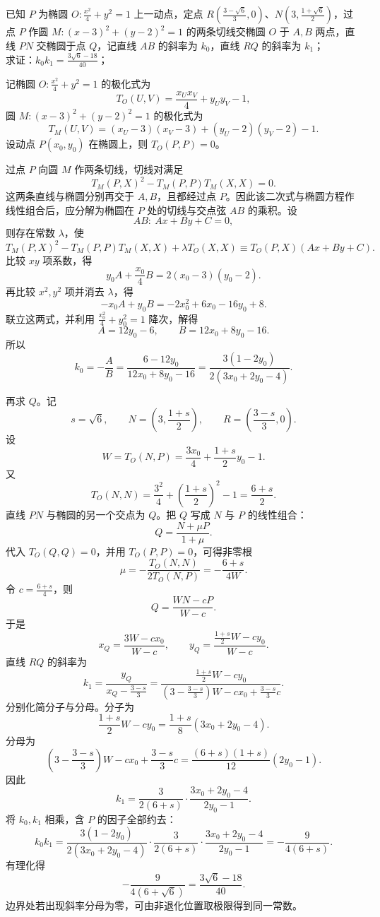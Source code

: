 \begin{exercise}
已知 \(P\) 为椭圆 \(O: \frac{x^2}{4} + y^2 = 1\) 上一动点，定点 \(R\left(\frac{3 - \sqrt{6}}{3}, 0\right)\)、\(N\left(3, \frac{1 + \sqrt{6}}{2}\right)\)，过点 \(P\) 作圆 \(M: (x - 3)^2 + (y - 2)^2 = 1\) 的两条切线交椭圆 \(O\) 于 \(A,B\) 两点，直线 \(PN\) 交椭圆于点 \(Q\)，记直线 \(AB\) 的斜率为 \(k_0\)，直线 \(RQ\) 的斜率为 \(k_1\)；\\
求证：\(k_0 k_1 = \frac{3\sqrt{6} - 18}{40}\)；
\end{exercise}
\begin{solution}
记椭圆 $O: \frac{x^2}{4}+y^2=1$ 的极化式为
\[
T_O(U,V)=\frac{x_Ux_V}{4}+y_Uy_V-1,
\]
圆 $M:(x-3)^2+(y-2)^2=1$ 的极化式为
\[
T_M(U,V)=(x_U-3)(x_V-3)+(y_U-2)(y_V-2)-1.
\]
设动点 $P(x_0,y_0)$ 在椭圆上，则 $T_O(P,P)=0$。

过点 $P$ 向圆 $M$ 作两条切线，切线对满足
\[
T_M(P,X)^2-T_M(P,P)T_M(X,X)=0.
\]
这两条直线与椭圆分别再交于 $A,B$，且都经过点 $P$。因此该二次式与椭圆方程作线性组合后，应分解为椭圆在 $P$ 处的切线与交点弦 $AB$ 的乘积。设
\[
AB:\ Ax+By+C=0,
\]
则存在常数 $\lambda$，使
\[
T_M(P,X)^2-T_M(P,P)T_M(X,X)+\lambda T_O(X,X)
\equiv T_O(P,X)(Ax+By+C).
\]
比较 $xy$ 项系数，得
\[
y_0A+\frac{x_0}{4}B=2(x_0-3)(y_0-2).
\]
再比较 $x^2,y^2$ 项并消去 $\lambda$，得
\[
-x_0A+y_0B=-2x_0^2+6x_0-16y_0+8.
\]
联立这两式，并利用 $\frac{x_0^2}{4}+y_0^2=1$ 降次，解得
\[
A=12y_0-6,\qquad B=12x_0+8y_0-16.
\]
所以
\[
k_0=-\frac AB
=\frac{6-12y_0}{12x_0+8y_0-16}
=\frac{3(1-2y_0)}{2(3x_0+2y_0-4)}.
\]

再求 $Q$。记
\[
s=\sqrt6,\qquad N=\left(3,\frac{1+s}{2}\right),\qquad R=\left(\frac{3-s}{3},0\right).
\]
设
\[
W=T_O(N,P)=\frac{3x_0}{4}+\frac{1+s}{2}y_0-1.
\]
又
\[
T_O(N,N)=\frac{3^2}{4}+\left(\frac{1+s}{2}\right)^2-1=\frac{6+s}{2}.
\]
直线 $PN$ 与椭圆的另一个交点为 $Q$。把 $Q$ 写成 $N$ 与 $P$ 的线性组合：
\[
Q=\frac{N+\mu P}{1+\mu}.
\]
代入 $T_O(Q,Q)=0$，并用 $T_O(P,P)=0$，可得非零根
\[
\mu=-\frac{T_O(N,N)}{2T_O(N,P)}=-\frac{6+s}{4W}.
\]
令 $c=\frac{6+s}{4}$，则
\[
Q=\frac{WN-cP}{W-c}.
\]
于是
\[
x_Q=\frac{3W-cx_0}{W-c},\qquad
y_Q=\frac{\frac{1+s}{2}W-cy_0}{W-c}.
\]
直线 $RQ$ 的斜率为
\[
k_1=\frac{y_Q}{x_Q-\frac{3-s}{3}}
=\frac{\frac{1+s}{2}W-cy_0}{\left(3-\frac{3-s}{3}\right)W-cx_0+\frac{3-s}{3}c}.
\]
分别化简分子与分母。分子为
\[
\frac{1+s}{2}W-cy_0
=\frac{1+s}{8}(3x_0+2y_0-4).
\]
分母为
\[
\left(3-\frac{3-s}{3}\right)W-cx_0+\frac{3-s}{3}c
=\frac{(6+s)(1+s)}{12}(2y_0-1).
\]
因此
\[
k_1=\frac{3}{2(6+s)}\cdot\frac{3x_0+2y_0-4}{2y_0-1}.
\]
将 $k_0,k_1$ 相乘，含 $P$ 的因子全部约去：
\[
k_0k_1
=\frac{3(1-2y_0)}{2(3x_0+2y_0-4)}
\cdot
\frac{3}{2(6+s)}\cdot\frac{3x_0+2y_0-4}{2y_0-1}
=-\frac{9}{4(6+s)}.
\]
有理化得
\[
-\frac{9}{4(6+\sqrt6)}
=\frac{3\sqrt6-18}{40}.
\]
边界处若出现斜率分母为零，可由非退化位置取极限得到同一常数。
\end{solution}




